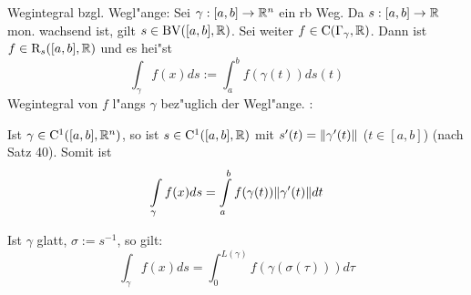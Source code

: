  Wegintegral bzgl. Wegl"ange:{
  Sei $\gamma:[a,b]\to\mathbb R^n$ ein rb Weg. Da $s:[a,b]\to\mathbb R$ mon.
  wachsend ist, gilt $s\in{\rm BV}([a,b],\mathbb R)$. 
  Sei weiter $f\in{\rm C}(\Gamma_\gamma,\mathbb R)$. 
  Dann ist $f\in{\rm R}_s([a,b],\mathbb R)$
  und es hei"st
  \[\int_\gamma f(x) ds:=\int_a^b f(\gamma(t))ds(t)
    \]
  Wegintegral von $f$ l"angs $\gamma$ bez"uglich der Wegl"ange.
  }
\remark:{
  \begin{stmts}
    \item Ist $\gamma\in{\rm C}^1([a,b],\mathbb R^n)$, so ist 
      $s\in{\rm C}^1([a,b],\mathbb R)$ mit $s'(t)={\left\| \gamma'(t)\right\|}$ ($t\in[a,b]$)
      (nach Satz 40). Somit ist
      \[\int_\gamma f(x)ds=\int_a^b f(\gamma(t))\norm{\gamma'(t)} dt
        \]
    \item Ist $\gamma$ glatt, $\sigma:=s^{-1}$, so gilt:
      \[\int_\gamma f(x) ds = \int_0^{L(\gamma)} f(\gamma(\sigma(\tau)))d\tau
        \]
    \end{stmts}
  }
